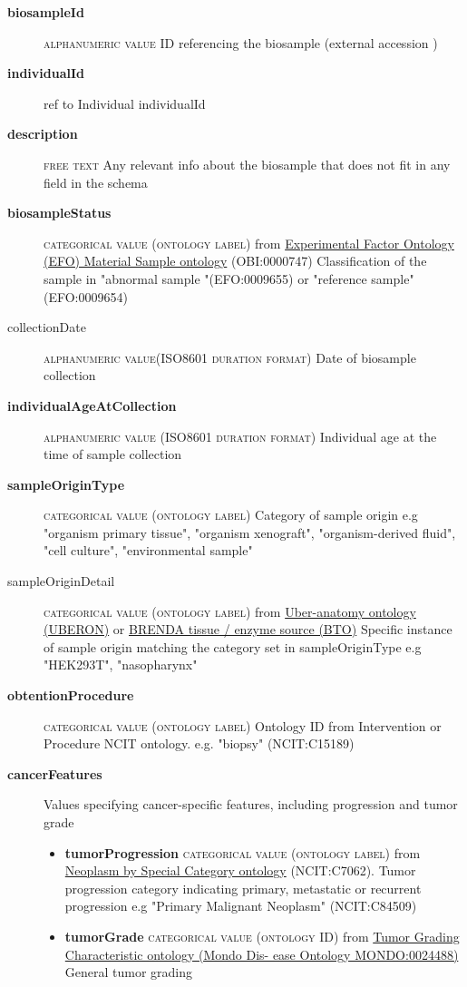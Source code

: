\documentclass[a4paper, 10pt]{article}        %
\begin{document}
  \begin{description}
	\item[\textbf{biosampleId}]  {\textsc{alphanumeric value}} ID referencing the biosample (external accession )
	\item[\textbf{individualId}] ref to Individual individualId
	\item[\textbf{description}]  {\textsc{free text}} Any relevant info about the biosample that does not fit in any field in the schema
	\item[\textbf{biosampleStatus}] {\textsc{categorical value (ontology label)}} from  \href{link}{Experimental Factor Ontology (EFO) Material Sample ontology} (OBI:0000747) Classification of the sample in "abnormal sample "(EFO:0009655) or "reference sample" (EFO:0009654)
	\item[collectionDate] {\textsc{alphanumeric value(ISO8601 duration format)}} Date of biosample collection
	\item[\textbf{individualAgeAtCollection}] {\textsc{alphanumeric value (ISO8601 duration format)}} Individual age at  the time of sample collection
	\item[\textbf{sampleOriginType}] {\textsc{categorical value (ontology label)}} Category of sample origin e.g "organism primary tissue", "organism xenograft", "organism-derived fluid", "cell culture", "environmental sample"
	\item[sampleOriginDetail] {\textsc{categorical value (ontology label)}} from \href{link}{Uber-anatomy ontology (UBERON)} or \href{link}{BRENDA tissue / enzyme
source (BTO)} Specific instance of sample origin matching the category set in sampleOriginType e.g "HEK293T", "nasopharynx"
	\item[\textbf{obtentionProcedure}] {\textsc{categorical value (ontology label)}} Ontology ID from Intervention or Procedure NCIT ontology. e.g. "biopsy" (NCIT:C15189) %
	\item[\textbf{cancerFeatures}] Values specifying cancer-specific features, including progression and tumor grade
	\begin{itemize}
			\item[] \textbf{tumorProgression} {\textsc{categorical value (ontology label)}} from \href{link}{Neoplasm by Special Category ontology} (NCIT:C7062). Tumor progression category indicating primary, metastatic or recurrent progression  e.g "Primary Malignant Neoplasm" (NCIT:C84509)
			\item[] \textbf{tumorGrade} {\textsc{categorical value (ontology ID)}} from \href{link}{Tumor Grading Characteristic ontology (Mondo Dis- ease Ontology MONDO:0024488)} General tumor grading  	
\end{itemize} 
 \end{description}
 
\end{document}
